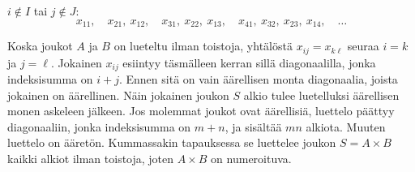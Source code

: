 \documentclass[11pt,a4paper]{amsart}
\begin{document}
\begin{solution}
\begin{samepage}
\(i \notin I\) tai \(j \notin J\):
\[
x_{11},\quad
x_{21},\ x_{12},\quad
x_{31},\ x_{22},\ x_{13},\quad
x_{41},\ x_{32},\ x_{23},\ x_{14},\quad \ldots
\]
\end{samepage}
Koska joukot \(A\) ja \(B\) on lueteltu ilman toistoja, yhtälöstä
\(x_{ij} = x_{k\ell}\) seuraa \(i = k\) ja \(j = \ell\).
Jokainen \(x_{ij}\) esiintyy täsmälleen kerran sillä diagonaalilla,
jonka indeksisumma on \(i+j\).
Ennen sitä on vain äärellisen monta diagonaalia, joista jokainen on
äärellinen. Näin jokainen joukon \(S\) alkio tulee luetelluksi äärellisen
monen askeleen jälkeen. Jos molemmat joukot ovat äärellisiä, luettelo
päättyy diagonaaliin, jonka indeksisumma on \(m+n\), ja sisältää
\(mn\) alkiota. Muuten luettelo
on ääretön. Kummassakin tapauksessa se luettelee joukon \(S = A \times B\)
kaikki alkiot ilman toistoja, joten \(A \times B\) on numeroituva.

\end{solution}
\end{document}
